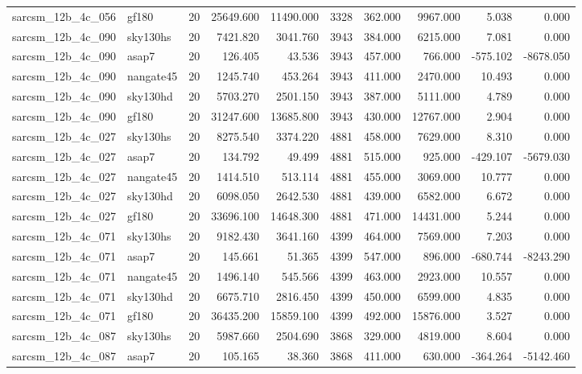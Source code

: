 \documentclass{article}
\begin{document}
\begin{longtable}{llrrrrrrrr}
sarcsm\_12b\_4c\_056 & gf180 & 20 & 25649.600 & 11490.000 & 3328 & 362.000 & 9967.000 & 5.038 & 0.000 \\
sarcsm\_12b\_4c\_090 & sky130hs & 20 & 7421.820 & 3041.760 & 3943 & 384.000 & 6215.000 & 7.081 & 0.000 \\
sarcsm\_12b\_4c\_090 & asap7 & 20 & 126.405 & 43.536 & 3943 & 457.000 & 766.000 & -575.102 & -8678.050 \\
sarcsm\_12b\_4c\_090 & nangate45 & 20 & 1245.740 & 453.264 & 3943 & 411.000 & 2470.000 & 10.493 & 0.000 \\
sarcsm\_12b\_4c\_090 & sky130hd & 20 & 5703.270 & 2501.150 & 3943 & 387.000 & 5111.000 & 4.789 & 0.000 \\
sarcsm\_12b\_4c\_090 & gf180 & 20 & 31247.600 & 13685.800 & 3943 & 430.000 & 12767.000 & 2.904 & 0.000 \\
sarcsm\_12b\_4c\_027 & sky130hs & 20 & 8275.540 & 3374.220 & 4881 & 458.000 & 7629.000 & 8.310 & 0.000 \\
sarcsm\_12b\_4c\_027 & asap7 & 20 & 134.792 & 49.499 & 4881 & 515.000 & 925.000 & -429.107 & -5679.030 \\
sarcsm\_12b\_4c\_027 & nangate45 & 20 & 1414.510 & 513.114 & 4881 & 455.000 & 3069.000 & 10.777 & 0.000 \\
sarcsm\_12b\_4c\_027 & sky130hd & 20 & 6098.050 & 2642.530 & 4881 & 439.000 & 6582.000 & 6.672 & 0.000 \\
sarcsm\_12b\_4c\_027 & gf180 & 20 & 33696.100 & 14648.300 & 4881 & 471.000 & 14431.000 & 5.244 & 0.000 \\
sarcsm\_12b\_4c\_071 & sky130hs & 20 & 9182.430 & 3641.160 & 4399 & 464.000 & 7569.000 & 7.203 & 0.000 \\
sarcsm\_12b\_4c\_071 & asap7 & 20 & 145.661 & 51.365 & 4399 & 547.000 & 896.000 & -680.744 & -8243.290 \\
sarcsm\_12b\_4c\_071 & nangate45 & 20 & 1496.140 & 545.566 & 4399 & 463.000 & 2923.000 & 10.557 & 0.000 \\
sarcsm\_12b\_4c\_071 & sky130hd & 20 & 6675.710 & 2816.450 & 4399 & 450.000 & 6599.000 & 4.835 & 0.000 \\
sarcsm\_12b\_4c\_071 & gf180 & 20 & 36435.200 & 15859.100 & 4399 & 492.000 & 15876.000 & 3.527 & 0.000 \\
sarcsm\_12b\_4c\_087 & sky130hs & 20 & 5987.660 & 2504.690 & 3868 & 329.000 & 4819.000 & 8.604 & 0.000 \\
sarcsm\_12b\_4c\_087 & asap7 & 20 & 105.165 & 38.360 & 3868 & 411.000 & 630.000 & -364.264 & -5142.460 \\

\end{longtable}
\end{document}

